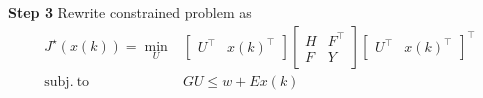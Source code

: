 \textbf{Step 3} Rewrite constrained problem as
\[\begin{aligned}
		J^\star(x(k)) = \min_U
		                       & \begin{bmatrix}
			                         U^\top & x(k)^\top
		                         \end{bmatrix}
		\left[\begin{smallmatrix}
				      H & F^\top \\
				      F & Y
			      \end{smallmatrix}\right]
		\begin{bmatrix}
			U^\top & x(k)^\top
		\end{bmatrix}^\top                          \\
		\mathrm{subj. \ to \ } & GU \leq w + Ex(k)
	\end{aligned} \]


